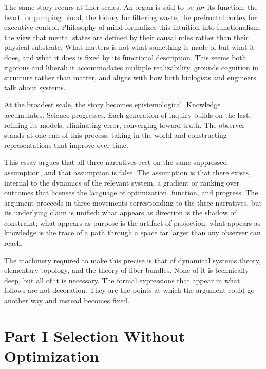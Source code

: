 \documentclass[12pt, a4paper, oneside]{article}
\theoremstyle{plain}
\theoremstyle{definition}
\theoremstyle{remark}
\begin{document}
The same story recurs at finer scales. An organ is said to be \emph{for} its function: the heart for pumping blood, the kidney for filtering waste, the prefrontal cortex for executive control. Philosophy of mind formalizes this intuition into functionalism, the view that mental states are defined by their causal roles rather than their physical substrate. What matters is not what something is made of but what it does, and what it does is fixed by its functional description. This seems both rigorous and liberal: it accommodates multiple realizability, grounds cognition in structure rather than matter, and aligns with how both biologists and engineers talk about systems.

At the broadest scale, the story becomes epistemological. Knowledge accumulates. Science progresses. Each generation of inquiry builds on the last, refining its models, eliminating error, converging toward truth. The observer stands at one end of this process, taking in the world and constructing representations that improve over time.

This essay argues that all three narratives rest on the same suppressed assumption, and that assumption is false. The assumption is that there exists, internal to the dynamics of the relevant system, a gradient or ranking over outcomes that licenses the language of optimization, function, and progress. The argument proceeds in three movements corresponding to the three narratives, but its underlying claim is unified: what appears as direction is the shadow of constraint; what appears as purpose is the artifact of projection; what appears as knowledge is the trace of a path through a space far larger than any observer can reach.

The machinery required to make this precise is that of dynamical systems theory, elementary topology, and the theory of fiber bundles. None of it is technically deep, but all of it is necessary. The formal expressions that appear in what follows are not decoration. They are the points at which the argument could go another way and instead becomes fixed.

\section*{Part I \quad Selection Without Optimization}
\end{document}
